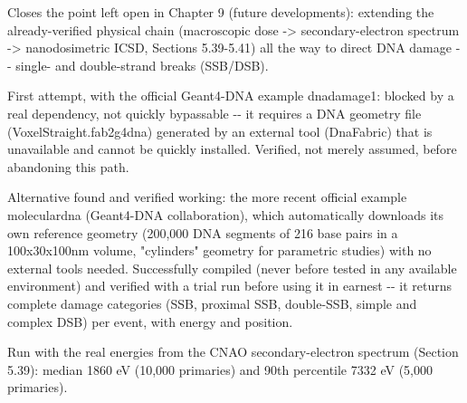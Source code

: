 \documentclass[
  english,
]{article}
\begin{document}
Closes the point left open in Chapter 9 (future developments): extending the already-verified physical chain (macroscopic dose -\textgreater{} secondary-electron spectrum -\textgreater{} nanodosimetric ICSD, Sections 5.39-5.41) all the way to direct DNA damage -\/- single- and double-strand breaks (SSB/DSB).

First attempt, with the official Geant4-DNA example dnadamage1: blocked by a real dependency, not quickly bypassable -\/- it requires a DNA geometry file (VoxelStraight.fab2g4dna) generated by an external tool (DnaFabric) that is unavailable and cannot be quickly installed. Verified, not merely assumed, before abandoning this path.

Alternative found and verified working: the more recent official example moleculardna (Geant4-DNA collaboration), which automatically downloads its own reference geometry (200,000 DNA segments of 216 base pairs in a 100x30x100nm volume, "cylinders" geometry for parametric studies) with no external tools needed. Successfully compiled (never before tested in any available environment) and verified with a trial run before using it in earnest -\/- it returns complete damage categories (SSB, proximal SSB, double-SSB, simple and complex DSB) per event, with energy and position.

Run with the real energies from the CNAO secondary-electron spectrum (Section 5.39): median 1860 eV (10,000 primaries) and 90th percentile 7332 eV (5,000 primaries).
\end{document}
